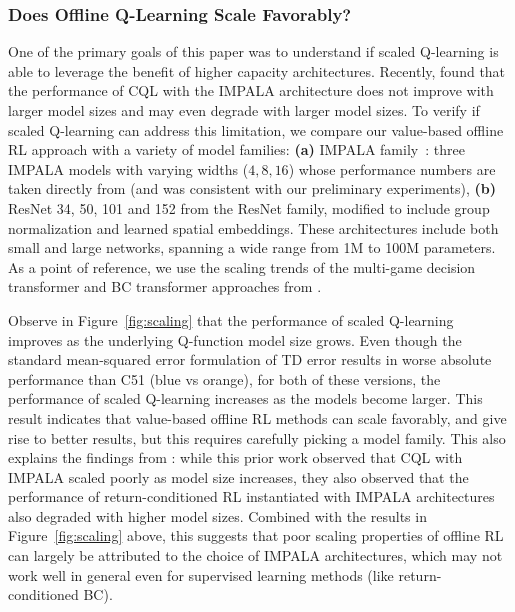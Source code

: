 \subsubsection{Does Offline Q-Learning Scale Favorably?}
\vspace{-0.15cm}
One of the primary goals of this paper was to understand if scaled Q-learning is able to leverage the benefit of higher capacity architectures. Recently, \citet{lee2022multi} found that the performance of CQL with the IMPALA architecture does not improve with larger model sizes and may even degrade with larger model sizes. To verify if scaled Q-learning can address this limitation, we compare our value-based offline RL approach with a variety of model families: \textbf{(a)} IMPALA family~\citep{espeholt2018impala}: three IMPALA models with varying widths ($4, 8, 16$) whose performance numbers are taken directly from \citet{lee2022multi} (and was consistent with our preliminary experiments), 
\textbf{(b)} ResNet 34, 50, 101 and 152 from the ResNet family, modified to include group normalization and learned spatial embeddings.%
These architectures include both small and large networks, spanning a wide range from 1M to 100M parameters. As a point of reference, we use the scaling trends of the multi-game decision transformer and BC transformer approaches from \citet{lee2022multi}.

Observe in Figure~\ref{fig:scaling} that the performance of scaled Q-learning improves as the underlying Q-function model size grows. Even though the standard mean-squared error formulation of TD error results in worse absolute performance than C51 (blue vs orange), for both of these versions, the performance of scaled Q-learning increases as the models become larger. This result indicates that value-based offline RL methods can scale favorably, and give rise to better results, but this requires carefully picking a model family. This also explains the findings from \citet{lee2022multi}: while this prior work observed that CQL with IMPALA scaled poorly as model size increases, they also observed that the performance of return-conditioned RL instantiated with IMPALA architectures also degraded with higher model sizes. Combined with the results in Figure~\ref{fig:scaling} above, this suggests that poor scaling properties of offline RL can largely be attributed to the choice of IMPALA architectures, which may not work well in general even for supervised learning methods (like return-conditioned BC).


